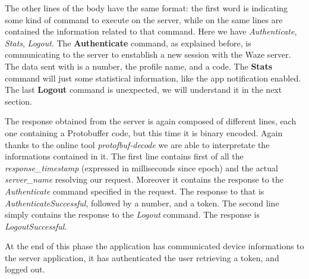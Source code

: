 			\par The other lines of the body have the same format: the first word is indicating some kind of command to execute on the server, while on the same lines are contained the information related to that command. Here we have \textit{Authenticate}, \textit{Stats}, \textit{Logout}. \newline
			The \textbf{Authenticate} command, as explained before, is communicating to the server to enstablish a new session with the Waze server. The data sent with is a number, the profile name, and a code.\newline
			The \textbf{Stats} command will just some statistical information, like the app notification enabled.\newline
			The last \textbf{Logout} command is unexpected, we will understand it in the next section.	\newline
			\par The response obtained from the server is again composed of different lines, each one containing a Protobuffer code, but this time it is binary encoded. Again thanks to the online tool \textit{protofbuf-decode} we are able to interpretate the informations contained in it.\newline
			The first line contains first of all the \textit{response\_timestamp} (expressed in milliseconds since epoch) and the actual \textit{server\_name} resolving our request. Moreover it contains the response to the \textit{Authenticate} command specified in the request. The response to that is \textit{AuthenticateSuccessful}, followed by a number, and a token.\newline
			The second line simply contains the response to the \textit{Logout} command. The response is \textit{LogoutSuccessful}. \newline
			\par At the end of this phase the application has communicated device informations to the server application, it has authenticated the user retrieving a token, and logged out. 
			
		\newpage

